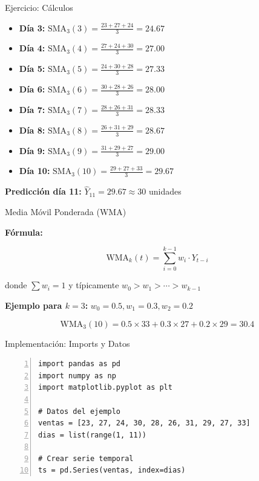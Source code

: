 \documentclass{beamer}
\begin{document}
\begin{frame}{Ejercicio: Cálculos}
    \begin{itemize}
        \item \textbf{Día 3:} $\text{SMA}_3(3) = \frac{23 + 27 + 24}{3} = 24.67$
        \item \textbf{Día 4:} $\text{SMA}_3(4) = \frac{27 + 24 + 30}{3} = 27.00$
        \item \textbf{Día 5:} $\text{SMA}_3(5) = \frac{24 + 30 + 28}{3} = 27.33$
        \item \textbf{Día 6:} $\text{SMA}_3(6) = \frac{30 + 28 + 26}{3} = 28.00$
        \item \textbf{Día 7:} $\text{SMA}_3(7) = \frac{28 + 26 + 31}{3} = 28.33$
        \item \textbf{Día 8:} $\text{SMA}_3(8) = \frac{26 + 31 + 29}{3} = 28.67$
        \item \textbf{Día 9:} $\text{SMA}_3(9) = \frac{31 + 29 + 27}{3} = 29.00$
        \item \textbf{Día 10:} $\text{SMA}_3(10) = \frac{29 + 27 + 33}{3} = 29.67$
    \end{itemize}
    
    \vspace{0.3cm}
    
    \textbf{Predicción día 11:} $\hat{Y}_{11} = 29.67 \approx 30$ unidades
\end{frame}

\begin{frame}{Media Móvil Ponderada (WMA)}
    \begin{center}
        \Large{\textbf{Fórmula:}}
        
        \vspace{0.5cm}
        
        \[
        \text{WMA}_k(t) = \sum_{i=0}^{k-1} w_i \cdot Y_{t-i}
        \]
        
        donde $\sum w_i = 1$ y típicamente $w_0 > w_1 > \cdots > w_{k-1}$
        
        \vspace{0.8cm}
        
        \textbf{Ejemplo para $k=3$:} $w_0 = 0.5, w_1 = 0.3, w_2 = 0.2$
        
        \[
        \text{WMA}_3(10) = 0.5 \times 33 + 0.3 \times 27 + 0.2 \times 29 = 30.4
        \]
    \end{center}
\end{frame}

\begin{frame}[fragile]{Implementación: Imports y Datos}
    \begin{lstlisting}[numbers=left, numbersep=5pt]
import pandas as pd
import numpy as np
import matplotlib.pyplot as plt

# Datos del ejemplo
ventas = [23, 27, 24, 30, 28, 26, 31, 29, 27, 33]
dias = list(range(1, 11))

# Crear serie temporal
ts = pd.Series(ventas, index=dias)
    \end{lstlisting}
\end{frame}
\end{document}
